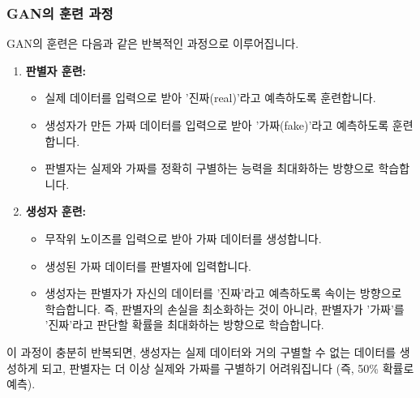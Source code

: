 \documentclass[11pt,a4paper]{article}
\begin{document}
\subsubsection{GAN의 훈련 과정}
GAN의 훈련은 다음과 같은 반복적인 과정으로 이루어집니다.
\begin{enumerate}
    \item \textbf{판별자 훈련:}
    \begin{itemize}
        \item 실제 데이터를 입력으로 받아 '진짜(real)'라고 예측하도록 훈련합니다.
        \item 생성자가 만든 가짜 데이터를 입력으로 받아 '가짜(fake)'라고 예측하도록 훈련합니다.
        \item 판별자는 실제와 가짜를 정확히 구별하는 능력을 최대화하는 방향으로 학습합니다.
    \end{itemize}
    \item \textbf{생성자 훈련:}
    \begin{itemize}
        \item 무작위 노이즈를 입력으로 받아 가짜 데이터를 생성합니다.
        \item 생성된 가짜 데이터를 판별자에 입력합니다.
        \item 생성자는 판별자가 자신의 데이터를 '진짜'라고 예측하도록 속이는 방향으로 학습합니다. 즉, 판별자의 손실을 최소화하는 것이 아니라, 판별자가 '가짜'를 '진짜'라고 판단할 확률을 최대화하는 방향으로 학습합니다.
    \end{itemize}
\end{enumerate}
이 과정이 충분히 반복되면, 생성자는 실제 데이터와 거의 구별할 수 없는 데이터를 생성하게 되고, 판별자는 더 이상 실제와 가짜를 구별하기 어려워집니다 (즉, 50\% 확률로 예측).
\end{document}
